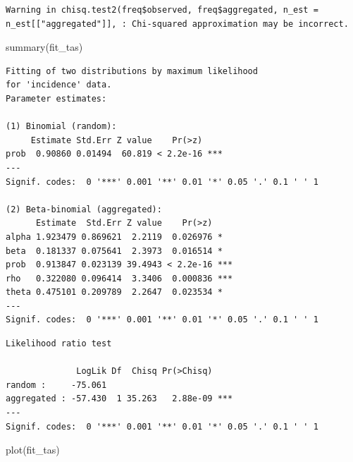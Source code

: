 \documentclass[
  letterpaper,
  DIV=11,
  numbers=noendperiod]{scrreprt}
\newenvironment{Shaded}{\begin{snugshade}}{\end{snugshade}}
\newcommand{\FunctionTok}[1]{\textcolor[rgb]{0.28,0.35,0.67}{#1}}
\newcommand{\NormalTok}[1]{\textcolor[rgb]{0.00,0.23,0.31}{#1}}
\newcommand{\SpecialCharTok}[1]{\textcolor[rgb]{0.37,0.37,0.37}{#1}}
\begin{document}
\begin{verbatim}
Warning in chisq.test2(freq$observed, freq$aggregated, n_est =
n_est[["aggregated"]], : Chi-squared approximation may be incorrect.
\end{verbatim}

\begin{Shaded}
\begin{Highlighting}[]
\FunctionTok{summary}\NormalTok{(fit\_tas)}
\end{Highlighting}
\end{Shaded}

\begin{verbatim}
Fitting of two distributions by maximum likelihood
for 'incidence' data.
Parameter estimates:

(1) Binomial (random):
     Estimate Std.Err Z value    Pr(>z)    
prob  0.90860 0.01494  60.819 < 2.2e-16 ***
---
Signif. codes:  0 '***' 0.001 '**' 0.01 '*' 0.05 '.' 0.1 ' ' 1

(2) Beta-binomial (aggregated):
      Estimate  Std.Err Z value    Pr(>z)    
alpha 1.923479 0.869621  2.2119  0.026976 *  
beta  0.181337 0.075641  2.3973  0.016514 *  
prob  0.913847 0.023139 39.4943 < 2.2e-16 ***
rho   0.322080 0.096414  3.3406  0.000836 ***
theta 0.475101 0.209789  2.2647  0.023534 *  
---
Signif. codes:  0 '***' 0.001 '**' 0.01 '*' 0.05 '.' 0.1 ' ' 1
\end{verbatim}

\begin{Shaded}
\end{Shaded}

\begin{verbatim}
Likelihood ratio test

              LogLik Df  Chisq Pr(>Chisq)    
random :     -75.061                         
aggregated : -57.430  1 35.263   2.88e-09 ***
---
Signif. codes:  0 '***' 0.001 '**' 0.01 '*' 0.05 '.' 0.1 ' ' 1
\end{verbatim}

\begin{Shaded}
\begin{Highlighting}[]
\FunctionTok{plot}\NormalTok{(fit\_tas)}
\end{Highlighting}
\end{Shaded}
\end{document}
